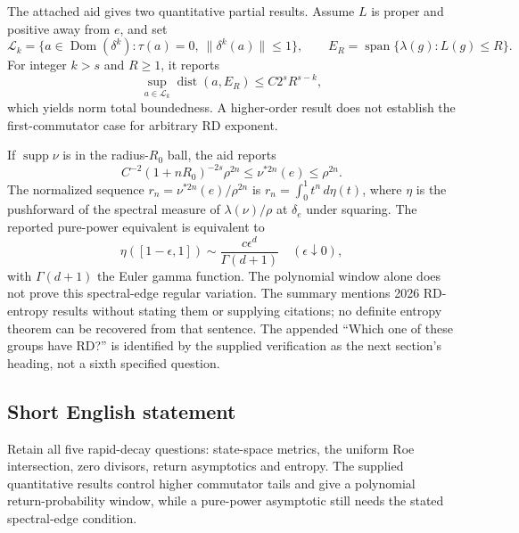 \documentclass[11pt]{article}
\begin{document}
The attached aid gives two quantitative partial results. Assume \(L\) is proper and positive away from \(e\), and set
\[
 \mathcal L_k=\{a\in\operatorname{Dom}(\delta^k):\tau(a)=0,\ \|\delta^k(a)\|\le1\},\qquad
 E_R=\operatorname{span}\{\lambda(g):L(g)\le R\}.
\]
For integer \(k>s\) and \(R\ge1\), it reports
\[
 \sup_{a\in\mathcal L_k}\operatorname{dist}(a,E_R)\le C2^sR^{s-k},
\]
which yields norm total boundedness. A higher-order result does not establish the first-commutator case for arbitrary RD exponent.

If \(\operatorname{supp}\nu\) is in the radius-\(R_0\) ball, the aid reports
\[
 C^{-2}(1+nR_0)^{-2s}\rho^{2n}\le\nu^{*2n}(e)\le\rho^{2n}.
\]
The normalized sequence \(r_n=\nu^{*2n}(e)/\rho^{2n}\) is \(r_n=\int_0^1t^n\,d\eta(t)\), where \(\eta\) is the pushforward of the spectral measure of \(\lambda(\nu)/\rho\) at \(\delta_e\) under squaring. The reported pure-power equivalent is equivalent to
\[
 \eta([1-\epsilon,1])\sim\frac{c\epsilon^d}{\Gamma(d+1)}\quad(\epsilon\downarrow0),
\]
with \(\Gamma(d+1)\) the Euler gamma function. The polynomial window alone does not prove this spectral-edge regular variation. The summary mentions 2026 RD-entropy results without stating them or supplying citations; no definite entropy theorem can be recovered from that sentence. The appended ``Which one of these groups have RD?'' is identified by the supplied verification as the next section's heading, not a sixth specified question.
\subsection{Short English statement}
Retain all five rapid-decay questions: state-space metrics, the uniform Roe intersection, zero divisors, return asymptotics and entropy. The supplied quantitative results control higher commutator tails and give a polynomial return-probability window, while a pure-power asymptotic still needs the stated spectral-edge condition.
\end{document}
